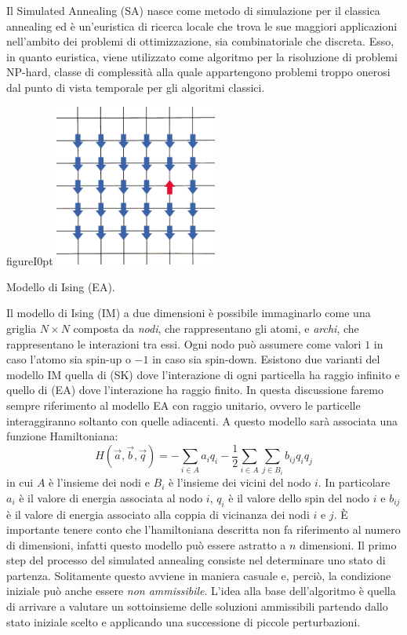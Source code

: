 \cite{QA,ST}Il Simulated Annealing (SA) nasce come metodo di simulazione per il classica annealing ed è un’euristica di ricerca locale che trova le sue maggiori applicazioni nell’ambito dei problemi di ottimizzazione, sia combinatoriale che discreta. Esso, in quanto euristica, viene utilizzato come algoritmo per la risoluzione di problemi NP-hard, classe di complessità alla quale appartengono problemi troppo onerosi dal punto di vista temporale per gli algoritmi classici.
\begin{wrapfloat}{figure}{I}{0pt}
\includegraphics[width=0.4\textwidth]{Immagini/ising.jpg}
\caption{Modello di Ising (EA).}
\label{figura:ising}
\end{wrapfloat}
\cite{QA}Il modello di Ising (IM) a due dimensioni è possibile immaginarlo come una griglia $N \times N$ composta da \textit{nodi}, che rappresentano gli atomi, e \textit{archi}, che rappresentano le interazioni tra essi. Ogni nodo può assumere come valori $1$ in caso l'atomo sia spin-up o $-1$ in caso sia spin-down. Esistono due varianti del modello IM quella di  (SK) dove l'interazione di ogni particella ha raggio infinito e quello di   (EA) dove l'interazione ha raggio finito. In questa discussione faremo sempre riferimento al modello EA con raggio unitario, ovvero le particelle interaggiranno soltanto con quelle adiacenti. A questo modello sarà associata una funzione Hamiltoniana:
$$ H(\vec{a}, \vec{b}, \vec{q}) = - \sum_{i \in A } a_i q_i - \frac{1}{2} \sum_{i \in A} \sum_{j \in B_i} b_{ij} q_i q_j $$
in cui $A$ è l'insieme dei nodi e $B_i$ è l'insieme dei vicini del nodo $i$. In particolare $a_i$ è il valore di energia associata al nodo $i$, $q_i$ è il valore dello spin del nodo $i$ e $b_{ij}$ è il valore di energia associato alla coppia di vicinanza dei nodi $i$ e $j$. È importante tenere conto che l'hamiltoniana descritta non fa riferimento al numero di dimensioni, infatti questo modello può essere astratto a $n$ dimensioni.
\cite{QA, MC, ST}Il primo step del processo del simulated annealing consiste nel determinare uno stato di
partenza. Solitamente questo avviene in maniera casuale e, perciò, la condizione iniziale può anche essere \textit{non ammissibile}. L’idea alla base dell’algoritmo è quella di arrivare a valutare un sottoinsieme delle soluzioni ammissibili partendo dallo stato iniziale scelto e applicando una successione di piccole perturbazioni.

